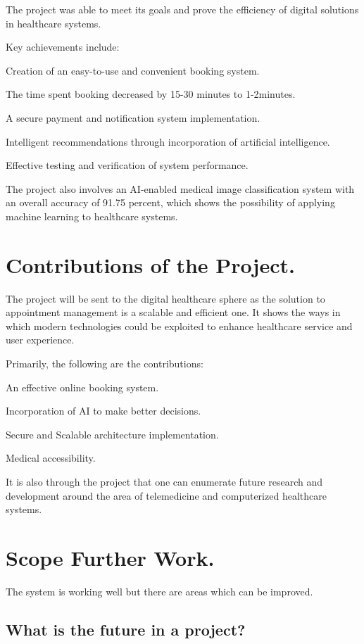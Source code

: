 The project was able to meet its goals and prove the efficiency of digital solutions in healthcare systems.

Key achievements include:

Creation of an easy-to-use and convenient booking system.

The time spent booking decreased by 15-30 minutes to 1-2minutes.

A secure payment and notification system implementation.

Intelligent recommendations through incorporation of artificial intelligence.

Effective testing and verification of system performance.

The project also involves an AI-enabled medical image classification system with an overall accuracy of 91.75 percent, which shows the possibility of applying machine learning to healthcare systems.

\section{Contributions of the Project.}

The project will be sent to the digital healthcare sphere as the solution to appointment management is a scalable and efficient one. It shows the ways in which modern technologies could be exploited to enhance healthcare service and user experience.

Primarily, the following are the contributions:

An effective online booking system.

Incorporation of AI to make better decisions.

Secure and Scalable architecture implementation.

Medical accessibility.

It is also through the project that one can enumerate future research and development around the area of telemedicine and computerized healthcare systems.

\section{Scope Further Work.}

The system is working well but there are areas which can be improved.

\subsection{What is the future in a project?}

